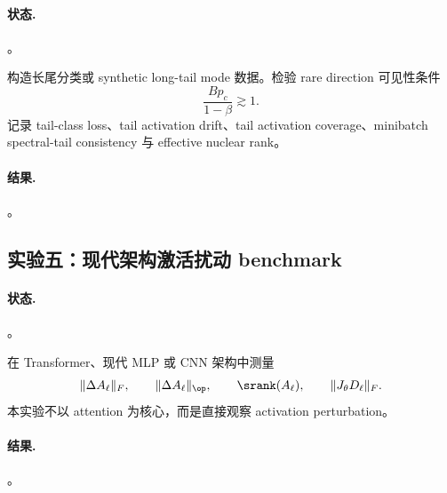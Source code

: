 \paragraph{状态.} \TBD。

构造长尾分类或 synthetic long-tail mode 数据。检验 rare direction 可见性条件
\[
\frac{Bp_c}{1-\beta}\gtrsim 1.
\]
记录 tail-class loss、tail activation drift、tail activation coverage、minibatch spectral-tail consistency 与 effective nuclear rank。

\paragraph{结果.} \TBD。

\subsection{实验五：现代架构激活扰动 benchmark}

\paragraph{状态.} \TBD。

在 Transformer、现代 MLP 或 CNN 架构中测量
\[
\|\Delta A_\ell\|_F,
\qquad
\|\Delta A_\ell\|_{\op},
\qquad
\srank(A_\ell),
\qquad
\|J_\theta D_\ell\|_F.
\]
本实验不以 attention 为核心，而是直接观察 activation perturbation。

\paragraph{结果.} \TBD。

